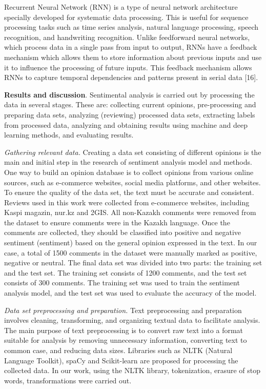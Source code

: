\begin{multicols}{2}
Recurrent Neural Network (RNN) is a type of neural network architecture
specially developed for systematic data processing. This is useful for
sequence processing tasks such as time series analysis, natural language
processing, speech recognition, and handwriting recognition. Unlike
feedforward neural networks, which process data in a single pass from
input to output, RNNs have a feedback mechanism which allows them to
store information about previous inputs and use it to influence the
processing of future inputs. This feedback mechanism allows RNNs to
capture temporal dependencies and patterns present in serial data
{[}16{]}.

{\bfseries Results and discussion}. Sentimental analysis is carried out by
processing the data in several stages. These are: collecting current
opinions, pre-processing and preparing data sets, analyzing (reviewing)
processed data sets, extracting labels from processed data, analyzing
and obtaining results using machine and deep learning methods, and
evaluating results.

\emph{Gathering relevant data.} Creating a data set consisting of
different opinions is the main and initial step in the research of
sentiment analysis model and methods. One way to build an opinion
database is to collect opinions from various online sources, such as
e-commerce websites, social media platforms, and other websites. To
ensure the quality of the data set, the text must be accurate and
consistent. Reviews used in this work were collected from e-commerce
websites, including Kaspi magazin, nur.kz and 2GIS. All non-Kazakh
comments were removed from the dataset to ensure comments were in the
Kazakh language. Once the comments are collected, they should be
classified into positive and negative sentiment (sentiment) based on the
general opinion expressed in the text. In our case, a total of 1500
comments in the dataset were manually marked as positive, negative or
neutral. The final data set was divided into two parts: the training set
and the test set. The training set consists of 1200 comments, and the
test set consists of 300 comments. The training set was used to train
the sentiment analysis model, and the test set was used to evaluate the
accuracy of the model.

\emph{Data set preprocessing and preparation.} Text preprocessing and
preparation involves cleaning, transforming, and organizing textual data
to facilitate analysis. The main purpose of text preprocessing is to
convert raw text into a format suitable for analysis by removing
unnecessary information, converting text to common case, and reducing
data sizes. Libraries such as NLTK (Natural Language Toolkit), spaCy and
Scikit-learn are proposed for processing the collected data. In our
work, using the NLTK library, tokenization, erasure of stop words,
transformations were carried out.


\end{multicols}

